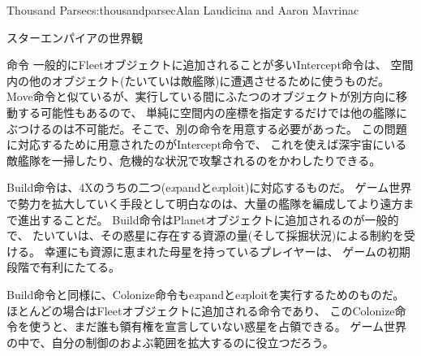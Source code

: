 \begin{aosachapter}{Thousand Parsec}{s:thousandparsec}{Alan Laudicina and Aaron Mavrinac}
\begin{aosasect1}{スターエンパイアの世界観}
\begin{aosasect2}{命令}
一般的にFleetオブジェクトに追加されることが多いIntercept命令は、
空間内の他のオブジェクト(たいていは敵艦隊)に遭遇させるために使うものだ。
Move命令と似ているが、実行している間にふたつのオブジェクトが別方向に移動する可能性もあるので、
単純に空間内の座標を指定するだけでは他の艦隊にぶつけるのは不可能だ。そこで、別の命令を用意する必要があった。
この問題に対応するために用意されたのがIntercept命令で、
これを使えば深宇宙にいる敵艦隊を一掃したり、危機的な状況で攻撃されるのをかわしたりできる。

Build命令は、4Xのうちの二つ(e\emph{x}pandとe\emph{x}ploit)に対応するものだ。
ゲーム世界で勢力を拡大していく手段として明白なのは、大量の艦隊を編成してより遠方まで進出することだ。
Build命令はPlanetオブジェクトに追加されるのが一般的で、
たいていは、その惑星に存在する資源の量(そして採掘状況)による制約を受ける。
幸運にも資源に恵まれた母星を持っているプレイヤーは、
ゲームの初期段階で有利にたてる。

Build命令と同様に、Colonize命令もe\emph{x}pandとe\emph{x}ploitを実行するためのものだ。
ほとんどの場合はFleetオブジェクトに追加される命令であり、
このColonize命令を使うと、まだ誰も領有権を宣言していない惑星を占領できる。
ゲーム世界の中で、自分の制御のおよぶ範囲を拡大するのに役立つだろう。


\end{aosasect2}
\end{aosasect1}
\end{aosachapter}
